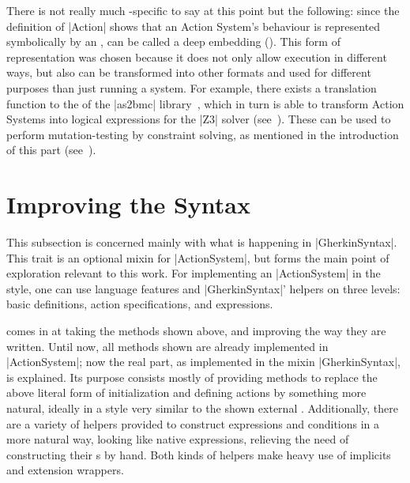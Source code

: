 There is not really much -specific to say at this point but the following: since the
definition of |Action| shows that an Action System's behaviour is represented symbolically by an
, \actium{} can be called a deep embedding (\cf {}). This
form of representation was chosen because it does not only allow execution in different ways, but
also can be transformed into other formats and used for different purposes than just running a
system. For example, there exists a translation function to the  of the |as2bmc|
library~\cite{maderbacher2016:weak}, which in turn is able to transform Action Systems into logical
expressions for the |Z3|  solver (see~). These
can be used to perform mutation-testing by constraint solving, as mentioned in the introduction of
this part (see~).


\section{Improving the Syntax}
\label{sec:improving_syntax}

This subsection is concerned mainly with what is happening in |GherkinSyntax|. This trait is an
optional mixin for |ActionSystem|, but forms the main point of exploration relevant to this
work. For implementing an |ActionSystem| in the  style, one can use language features
and |GherkinSyntax|' helpers on three levels: basic definitions, action specifications, and
expressions.

 comes in at taking the methods shown above, and improving the way
they are written. Until now, all methods shown are already implemented in |ActionSystem|; now the
real \dsl{} part, as implemented in the mixin |GherkinSyntax|, is explained. Its purpose consists
mostly of providing methods to replace the above literal form of initialization and defining actions
by something more natural, ideally in a style very similar to the shown external
\dsl{}. Additionally, there are a variety of helpers provided to construct expressions and
conditions in a more natural way, looking like native expressions, relieving the need of
constructing their s by hand. Both kinds of helpers make heavy use of implicits and
extension wrappers.

